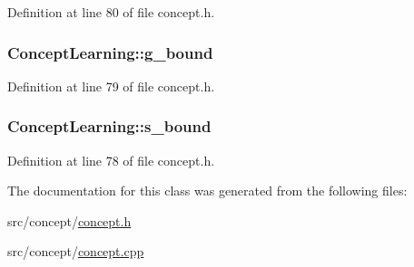 Definition at line 80 of file concept.\-h.

\hypertarget{class_concept_learning_a449a58ac04e18fd981b2e6bf984fd764}{
\subsubsection[{g\-\_\-bound}]{ Concept\-Learning\-::g\-\_\-bound\hspace{0.3cm}{\ttfamily [private]}}}\label{class_concept_learning_a449a58ac04e18fd981b2e6bf984fd764}


Definition at line 79 of file concept.\-h.

\hypertarget{class_concept_learning_a8ac1de9ab4694d91cffabda42443a96e}{
\subsubsection[{s\-\_\-bound}]{ Concept\-Learning\-::s\-\_\-bound\hspace{0.3cm}{\ttfamily [private]}}}\label{class_concept_learning_a8ac1de9ab4694d91cffabda42443a96e}


Definition at line 78 of file concept.\-h.



The documentation for this class was generated from the following files\-:\begin{DoxyCompactItemize}
\item 
src/concept/\hyperlink{concept_8h}{concept.\-h}\item 
src/concept/\hyperlink{concept_8cpp}{concept.\-cpp}\end{DoxyCompactItemize}
